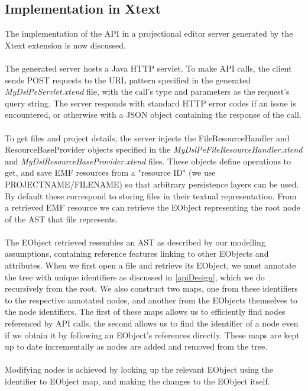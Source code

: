 \documentclass{article}
\begin{document}
{\subsection{Implementation in Xtext}
The implementation of the API in a projectional editor server generated by the Xtext extension is now discussed.
\\
\\
The generated server hosts a Java HTTP servlet. To make API calls, the client sends POST requests to the URL pattern specified in the generated \emph{MyDslPeServlet.xtend} file, with the call's type and parameters as the request's query string. The server responds with standard HTTP error codes if an issue is encountered, or otherwise with a JSON object containing the response of the call.
\\
\\
To get files and project details, the server injects the FileResourceHandler and ResourceBaseProvider objects specified in the \emph{MyDslPeFileResourceHandler.xtend} and \emph{MyDslResourceBaseProvider.xtend} files. These objects define operations to get, and save EMF resources from a "resource ID" (we use PROJECTNAME/FILENAME) so that arbitrary persistence layers can be used. By default these correspond to storing files in their textual representation. From a retrieved EMF resource we can retrieve the EObject representing the root node of the AST that file represents.
\\
\\
The EObject retrieved resembles an AST as described by our modelling assumptions, containing reference features linking to other EObjects and attributes. When we first open a file and retrieve its EObject, we must annotate the tree with unique identifiers as discussed in \ref{apiDesign}, which we do recursively from the root. We also construct two maps, one from these identifiers to the respective annotated nodes, and another from the EObjects themselves to the node identifiers. The first of these maps allows us to efficiently find nodes referenced by API calls, the second allows us to find the identifier of a node even if we obtain it by following an EObject's references directly. These maps are kept up to date incrementally as nodes are added and removed from the tree.
\\
\\
Modifying nodes is achieved by looking up the relevant EObject using the identifier to EObject map, and making the changes to the EObject itself.
\\
\\
}
\end{document}
